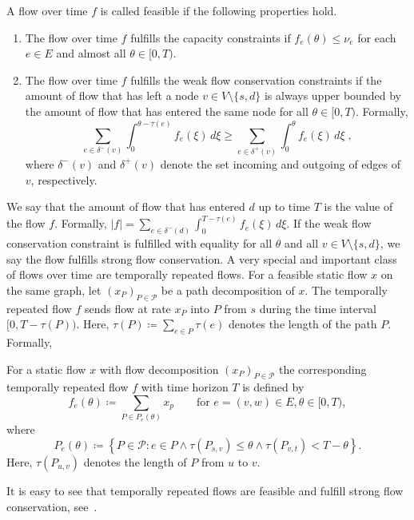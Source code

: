 \begin{definition}
    A flow over time $f$ is called feasible if the following properties hold.
    \begin{enumerate}
    \item The flow over time $f$ fulfills the capacity constraints if $f_e(\theta) \leq \nu_e$ for
each $e \in E$ and almost all $\theta \in [0, T )$.
    \item The flow over time $f$ fulfills the weak flow conservation constraints if the amount of flow that has left a node $v \in V\setminus \{s,d\}$ is always upper bounded by the amount of flow that has entered the same node for all $\theta \in [0,T)$. Formally,
    \[\sum_{e \in \delta^-(v)}\int_0^{\theta - \tau(e)}f_e(\xi)\,d\xi \geq \sum_{e \in \delta^+(v)}\int_0^{\theta}f_e(\xi)\,d\xi\;,\]
    where $\delta^-(v)$ and $\delta^+(v)$ denote the set incoming and outgoing of edges of $v$, respectively.
    \end{enumerate}
\end{definition}
\noindent We say that the amount of flow that has entered $d$ up to time $T$ is the value of the flow $f$. Formally, $|f| = \sum_{e \in \delta^-(d)}\int_0^{T - \tau(e)}f_e(\xi)\,d\xi$. If the weak flow conservation constraint is fulfilled with equality for all $\theta$ and all $v \in V\setminus\{s,d\}$, we say the flow fulfills strong flow conservation. A very special and important class of flows over time are temporally repeated flows. For a feasible static flow $x$ on the same graph, let $(x_P)_{P\in \mathcal{P}}$ be a path decomposition of $x$. The temporally repeated flow $f$ sends flow at rate $x_P$ into $P$ from $s$ during the time interval $[0,T-\tau(P))$. Here, $\tau(P)\coloneqq \sum_{e \in P}{\tau(e)}$ denotes the length of the path $P$. Formally,

\begin{definition}
For a static flow $x$ with flow decomposition $(x_P)_{P \in \mathcal{P}}$ the corresponding temporally repeated flow $f$ with time horizon $T$ is defined by
\[f_e(\theta) \coloneqq \sum_{P \in P_e(\theta)} x_p \qquad \text{for }e=(v,w) \in E, \theta \in [0,T),\]
where $$P_e(\theta) \coloneqq \left\{P \in \mathcal{P} : e \in P \wedge \tau(P_{s,v}) \leq \theta \wedge \tau(P_{v,t}) < T-\theta \right\}.$$ Here, $\tau(P_{u,v})$ denotes the length of $P$ from $u$ to $v$.
\end{definition}
\noindent It is easy to see that temporally repeated flows are feasible and fulfill strong flow conservation, see~\cite{Skutella2009survey}.

